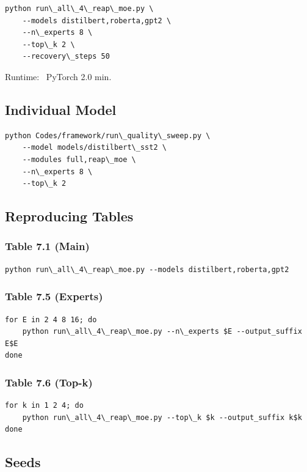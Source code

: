 \begin{lstlisting}
python run\_all\_4\_reap\_moe.py \
    --models distilbert,roberta,gpt2 \
    --n\_experts 8 \
    --top\_k 2 \
    --recovery\_steps 50
\end{lstlisting}

Runtime: ~PyTorch 2.0 min.

\subsection{Individual Model}

\begin{lstlisting}
python Codes/framework/run\_quality\_sweep.py \
    --model models/distilbert\_sst2 \
    --modules full,reap\_moe \
    --n\_experts 8 \
    --top\_k 2
\end{lstlisting}

\subsection{Reproducing Tables}

\subsubsection{Table 7.1 (Main)}
\begin{lstlisting}
python run\_all\_4\_reap\_moe.py --models distilbert,roberta,gpt2
\end{lstlisting}

\subsubsection{Table 7.5 (Experts)}
\begin{lstlisting}
for E in 2 4 8 16; do
    python run\_all\_4\_reap\_moe.py --n\_experts $E --output_suffix E$E
done
\end{lstlisting}

\subsubsection{Table 7.6 (Top-k)}
\begin{lstlisting}
for k in 1 2 4; do
    python run\_all\_4\_reap\_moe.py --top\_k $k --output_suffix k$k
done
\end{lstlisting}

\subsection{Seeds}

